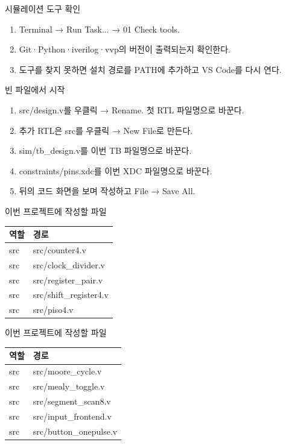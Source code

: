 \begin{frame}{시뮬레이션 도구 확인}
\small
\begin{enumerate}
\item Terminal → Run Task... → 01 Check tools.
\item Git·Python·iverilog·vvp의 버전이 출력되는지 확인한다.
\item 도구를 찾지 못하면 설치 경로를 PATH에 추가하고 VS Code를 다시 연다.
\end{enumerate}
\end{frame}

\begin{frame}{빈 파일에서 시작}
\small
\begin{enumerate}
\item src/design.v를 우클릭 → Rename. 첫 RTL 파일명으로 바꾼다.
\item 추가 RTL은 src를 우클릭 → New File로 만든다.
\item sim/tb\_design.v를 이번 TB 파일명으로 바꾼다.
\item constraints/pins.xdc를 이번 XDC 파일명으로 바꾼다.
\item 뒤의 코드 화면을 보며 작성하고 File → Save All.
\end{enumerate}
\end{frame}

\begin{frame}{이번 프로젝트에 작성할 파일}
\small
\begin{center}\renewcommand{\arraystretch}{1.55}\begin{tabular}{ll}
역할 & 경로\\\hline
src & src/counter4.v\\
src & src/clock\_divider.v\\
src & src/register\_pair.v\\
src & src/shift\_register4.v\\
src & src/piso4.v\\
\end{tabular}\end{center}
\end{frame}

\begin{frame}{이번 프로젝트에 작성할 파일}
\small
\begin{center}\renewcommand{\arraystretch}{1.55}\begin{tabular}{ll}
역할 & 경로\\\hline
src & src/moore\_cycle.v\\
src & src/mealy\_toggle.v\\
src & src/segment\_scan8.v\\
src & src/input\_frontend.v\\
src & src/button\_onepulse.v\\
\end{tabular}\end{center}
\end{frame}

